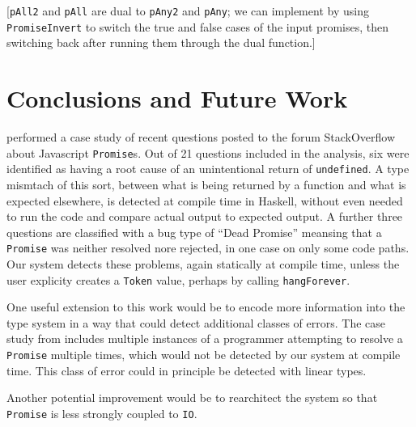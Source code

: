 \documentclass[12pt, english, letterpaper]{kuthesis}
\newcommand{\lit}[1]{\texttt{#1}}
\begin{document}
[\lit{pAll2} and \lit{pAll} are dual to \lit{pAny2} and \lit{pAny}; we can implement by using \lit{PromiseInvert} to switch the true and false cases of the input promises, then switching back after running them through the dual function.]

\chapter*{Conclusions and Future Work}
\cite{madsen} performed a case study of recent questions posted to the forum StackOverflow about Javascript \lit{Promise}s.  Out of 21 questions included in the analysis, six were identified as having a root cause of an unintentional return of \lit{undefined}.  A type mismtach of this sort, between what is being returned by a function and what is expected elsewhere, is detected at compile time in Haskell, without even needed to run the code and compare actual output to expected output. A further three questions are classified with a bug type of ``Dead Promise'' meansing that a \lit{Promise} was neither resolved nore rejected, in one case on only some code paths.  Our system detects these problems, again statically at compile time, unless the user explicity creates a \lit{Token} value, perhaps by calling \lit{hangForever}.

One useful extension to this work would be to encode more information into the type system in a way that could detect additional classes of errors.  The case study from \cite{madsen} includes multiple instances of a programmer attempting to resolve a \lit{Promise} multiple times, which would not be detected by our system at compile time.  This class of error could in principle be detected with linear types.

Another potential improvement would be to rearchitect the system so that \lit{Promise} is less strongly coupled to \lit{IO}.



\end{document}
